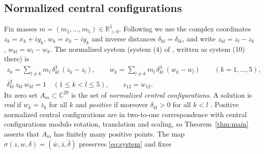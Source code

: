 \documentclass[Threeside,11pt]{article}
\theoremstyle{definition}
\theoremstyle{remark}
\numberwithin{equation}{section}
\newcommand{\C}{\mathbb C}\newcommand{\T}{\mathbb T}
\theoremstyle{remark}
\newcommand{\Rp}{\mathbb{R}_{>0}}
\begin{document}
\subsection{Normalized central configurations}
Fix masses $m=(m_1,\dots,m_5)\in\Rp^5$.  Following \cite[\S2]{AK} we use the complex coordinates
$z_k=x_k+iy_k$, $w_k=x_k-iy_k$ and inverse distances $\delta_{kl}=\delta_{lk}$, and write
$z_{kl}=z_l-z_k$, $w_{kl}=w_l-w_k$.  The normalized system (system (4) of \cite{AK}, written as
system (10) there) is
\begin{equation}\label{eq:system}
\begin{gathered}
  z_k = \sum_{l\ne k} m_l\,\delta_{kl}^3\,(z_k-z_l),\qquad
  w_k = \sum_{l\ne k} m_l\,\delta_{kl}^3\,(w_k-w_l)\qquad (k=1,\dots,5),\\
  \delta_{kl}^2\, z_{kl}\,w_{kl} = 1\quad (1\le k<l\le 5),\qquad z_{12} = w_{12}.
\end{gathered}
\end{equation}
Its zero set $A_m\subset\C^{20}$ is the set of \emph{normalized central configurations}.  A
solution is \emph{real} if $w_k=\bar z_k$ for all $k$ and \emph{positive} if moreover
$\delta_{kl}>0$ for all $k<l$ \cite[Def.~2]{AK}.  Positive normalized central configurations are
in two-to-one correspondence with central configurations modulo rotation, translation and
scaling, so Theorem~\ref{thm:main} asserts that $A_m$ has finitely many positive points.
The map $\sigma(z,w,\delta)=(\bar w,\bar z,\bar\delta)$ preserves \eqref{eq:system} and fixes
\end{document}
